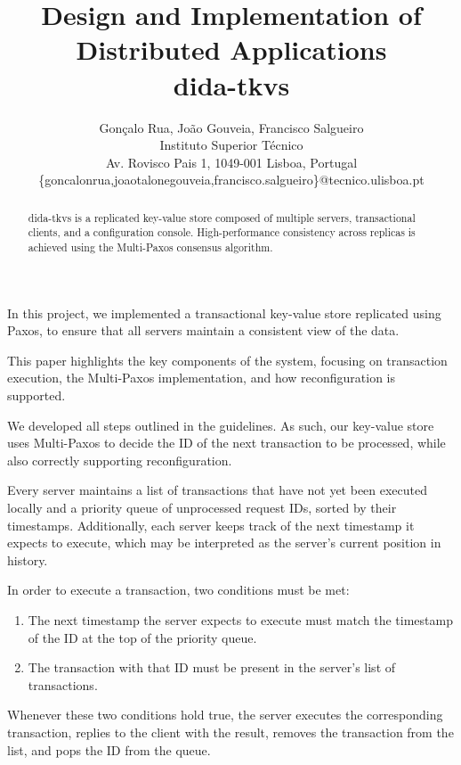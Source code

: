 \documentclass[times, 10pt,twocolumn]{article}
\begin{document}
\title{Design and Implementation of Distributed Applications\\
dida-tkvs}

\author{Gonçalo Rua, João Gouveia, Francisco Salgueiro\\
    Instituto Superior Técnico\\ Av. Rovisco Pais 1, 1049-001 Lisboa, Portugal\\
    \{goncalonrua,joaotalonegouveia,francisco.salgueiro\}@tecnico.ulisboa.pt\\
}

\maketitle
\thispagestyle{empty}

\begin{abstract}
    dida-tkvs is a replicated key-value store composed of multiple servers,
    transactional clients, and a configuration console. High-performance
    consistency across replicas is achieved using the Multi-Paxos consensus
    algorithm.
\end{abstract}

    In this project, we implemented a transactional key-value store replicated
    using Paxos, to ensure that all servers maintain a consistent view of the
    data.

    This paper highlights the key components of the system, focusing on
    transaction execution, the Multi-Paxos implementation, and how
    reconfiguration is supported.

    We developed all steps outlined in the guidelines. As such, our key-value
    store uses Multi-Paxos to decide the ID of the next transaction to be
    processed, while also correctly supporting reconfiguration.

    Every server maintains a list of transactions that have not yet been
    executed locally and a priority queue of unprocessed request IDs, sorted by
    their timestamps. Additionally, each server keeps track of the next
    timestamp it expects to execute, which may be interpreted as the server's
    current position in history.

    In order to execute a transaction, two conditions must be met:
    \begin{enumerate}
        \item The next timestamp the server expects to execute must match the
        timestamp of the ID at the top of the priority queue.
        \item The transaction with that ID must be present in the server's list
        of transactions.
    \end{enumerate}
    Whenever these two conditions hold true, the server executes the
    corresponding transaction, replies to the client with the result, removes
    the transaction from the list, and pops the ID from the queue.
\end{document}

